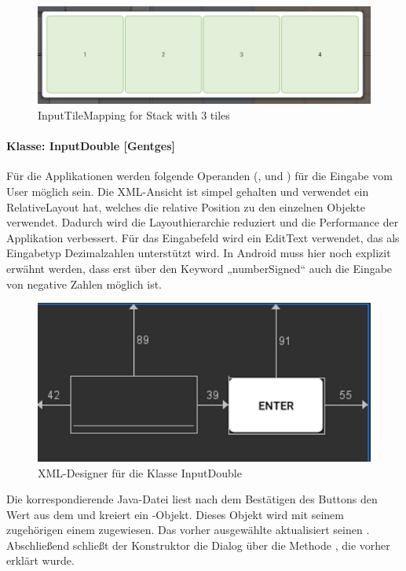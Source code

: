 \begin{figure}[h]
	\includegraphics[width=\columnwidth]{img/inputtilemapping-for-stack-with-3-tiles}
	\caption[InputTileMapping for Stack with 3 tiles]{InputTileMapping for Stack with 3 tiles\footnotemark}
\end{figure}

\paragraph{Klasse: InputDouble [Gentges]}

Für die Applikationen werden folgende Operanden (,  und ) für die Eingabe vom User möglich sein. Die XML-Ansicht ist simpel gehalten und verwendet ein RelativeLayout hat, welches die relative Position zu den einzelnen Objekte verwendet. Dadurch wird die Layouthierarchie reduziert und die Performance der Applikation verbessert. Für das Eingabefeld wird ein EditText verwendet, das als Eingabetyp Dezimalzahlen unterstützt wird. In Android muss hier noch explizit erwähnt werden, dass erst über den Keyword „numberSigned“ auch die Eingabe von negative Zahlen möglich ist.

\begin{figure}[h]
	\includegraphics[width=\columnwidth]{img/xml_InputDouble}
	\caption[XML-Designer für die Klassen InputDouble]{XML-Designer für die Klasse InputDouble\footnotemark}
\end{figure}

Die korrespondierende Java-Datei liest nach dem Bestätigen des Buttons den Wert aus dem  und kreiert ein -Objekt. Dieses Objekt wird mit seinem zugehörigen  einem  zugewiesen. Das vorher ausgewählte  aktualisiert seinen . Abschließend schließt der Konstruktor die Dialog über die Methode , die vorher erklärt wurde.

